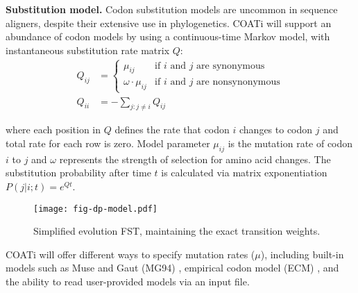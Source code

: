 
\textbf{Substitution model.}
Codon substitution models are uncommon in sequence aligners, despite their
extensive use in phylogenetics.
COATi will support an abundance of codon models by using a continuous-time
Markov model, with instantaneous substitution rate matrix $Q$:\\
\begin{align*} Q_{ij} &= \begin{cases}
    \mu_{ij} & \text{if $i$ and $j$ are synonymous}\\
    \omega \cdot \mu_{ij} & \text{if $i$ and $j$ are nonsynonymous}
    \end{cases}\\[10pt]
   Q_{ii} &= -\sum_{j:j \neq i} Q_{ij}
\end{align*}

where each position in $Q$ defines the rate that codon $i$ changes to codon $j$
and total rate for each row is zero.
Model parameter $\mu_{ij}$ is the mutation rate of codon $i$ to $j$ and $\omega$
represents the strength of selection for amino acid changes.
The substitution probability after time $t$ is calculated via matrix
exponentiation $P(j|i;t) = e^{Qt}$.

\begin{wrapfigure}[15]{r}{0.5\textwidth}
    \vspace{-1.5em}
    \centering
    \texttt{[image: fig-dp-model.pdf]}
    \caption{Simplified evolution FST, maintaining the exact transition weights.}
    \label{fig:dp-model}
\end{wrapfigure}

COATi will offer different ways to specify mutation rates ($\mu$), including
built-in models such as Muse and Gaut (MG94) \parencite{muse_gaut_1994},
empirical codon model (ECM) \parencite{kosiol_ECM_2007}, and the ability to read
user-provided models via an input file.


